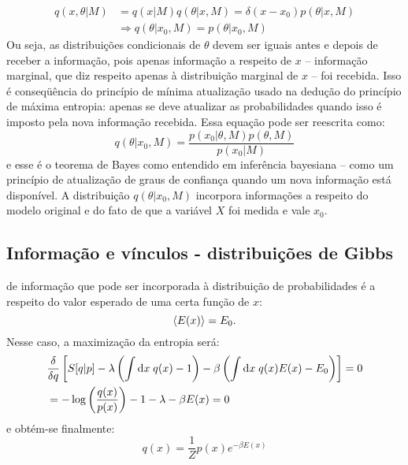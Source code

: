 \begin{align*}
 q(x,\theta|M) &= q(x|M)q(\theta|x, M) =  \delta(x-x_0) p(\theta|x, M) \\ &\Rightarrow q(\theta|x_0, M) = p(\theta|x_0, M)
\end{align*}
Ou seja, as distribuições condicionais de $\theta$ devem ser iguais antes e depois de receber a informação, pois apenas informação a respeito de $x$ -- informação marginal, que diz respeito apenas à distribuição marginal de $x$ -- foi recebida. Isso é conseqüência do princípio de mínima atualização usado na dedução do princípio de máxima entropia: apenas se deve atualizar as probabilidades quando isso é imposto pela nova informação recebida. Essa equação pode ser reescrita como:
\begin{equation}
 q(\theta | x_0, M) = \dfrac{p(x_0 | \theta, M)p(\theta, M)}{p(x_0 |M)}
\end{equation}
e esse é o teorema de Bayes como entendido em inferência bayesiana -- como um princípio de atualização de graus de confiança quando um nova informação está disponível. A distribuição $q(\theta | x_0, M)$ incorpora informações a respeito do modelo original e do fato de que a variável $X$ foi medida e vale $x_0$. 

\subsection{Informação e vínculos - distribuições de Gibbs}
 de informação que pode ser incorporada à distribuição de probabilidades é a respeito do valor esperado de uma certa função de $x$:
\[
 \left\langle E(x) \right\rangle = E_0.
\]
Nesse caso, a maximização da entropia será:
\begin{align*}
  &\frac{\delta}{\delta q} \left[S[q | p] - \lambda \left(\int \mathrm{d} x\; q(x) -1 \right) - \beta\left(\int\mathrm{d} x\; q(x) E(x) - E_0\right)\right] =0\\
  &= - \log\left(\frac{q(x)}{p(x)}\right) - 1 - \lambda -\beta E(x) = 0
\end{align*}
e obtém-se finalmente:
\begin{equation}
\label{eq:gibbs}
 q(x) = \dfrac{1}{Z}p(x) e^{-\beta E(x)}
\end{equation}

